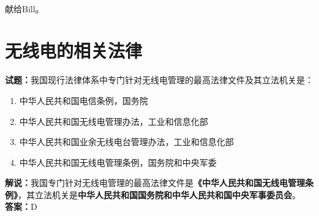 \documentclass{ctexbook}
\newcommand{\commit}{\dots~(in \emph{packed-refs})}}
\begin{document}

\title{}
\author{\large \texttt{BG7XTQ}（原\texttt{JJ1DSB}）编著}
\date{\large{日期：\texttt{\today}}
  \\版本：\texttt{\commit}在\texttt{\branch}分支上
  \vspace{\baselineskip}
  \\使用  编译
  \\使用了 \Morsesym 宏包
}

\maketitle

\thispagestyle{empty}
\vfil
\ \\
\vspace{15em}
\begin{center}
  {\Large 献给Bill。}
\end{center}

\newpage

\tableofcontents%





\chapter{无线电的相关法律}

\newpage

\noindent\textbf{试题：}我国现行法律体系中专门针对无线电管理的最高法律文件及其立法机关是：
\begin{enumerate}[leftmargin=3em]
  \item 中华人民共和国电信条例，国务院
  \item 中华人民共和国无线电管理办法，工业和信息化部
  \item 中华人民共和国业余无线电台管理办法，工业和信息化部
  \item 中华人民共和国无线电管理条例，国务院和中央军委
\end{enumerate}
\noindent\textbf{解说：}我国专门针对无线电管理的最高法律文件是\textbf{《中华人民共和国无线电管理条例》}，其立法机关是\textbf{中华人民共和国国务院和中华人民共和国中央军事委员会}。\\\noindent\textbf{答案：}D

\vspace{\baselineskip}
\end{document}
